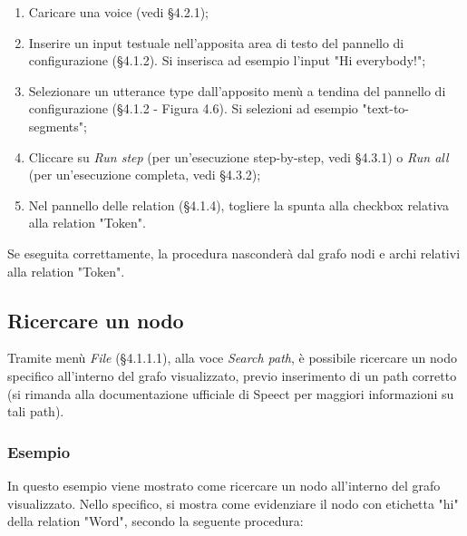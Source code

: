 \documentclass[openany,12pt,a4paper]{report}
\begin{document}
	\begin{enumerate}
		\item Caricare una voice (vedi §4.2.1);
		\item Inserire un input testuale nell'apposita area di testo del pannello di configurazione (§4.1.2). Si inserisca ad esempio l'input "Hi everybody!";
		\item Selezionare un utterance type dall'apposito menù a tendina del pannello di configurazione (§4.1.2 - Figura 4.6). Si selezioni ad esempio "text-to-segments";
		\item Cliccare su \textit{Run step} (per un'esecuzione step-by-step, vedi §4.3.1) o \textit{Run all} (per un'esecuzione completa, vedi §4.3.2);
		\item Nel pannello delle relation (§4.1.4), togliere la spunta alla checkbox relativa alla relation "Token".
	\end{enumerate}
	
	\noindent Se eseguita correttamente, la procedura nasconderà dal grafo nodi e archi relativi alla relation "Token".
	
	\subsection{Ricercare un nodo}
	Tramite menù \textit{File} (§4.1.1.1), alla voce \textit{Search path}, è possibile ricercare un nodo specifico all'interno del grafo visualizzato, previo inserimento di un path corretto (si rimanda alla documentazione ufficiale di Speect per maggiori informazioni su tali path).
	
	\subsubsection*{Esempio}
	
	In questo esempio viene mostrato come ricercare un nodo all'interno del grafo visualizzato. Nello specifico, si mostra come evidenziare il nodo con etichetta "hi" della relation "Word", secondo la seguente procedura:
	
\end{document}
